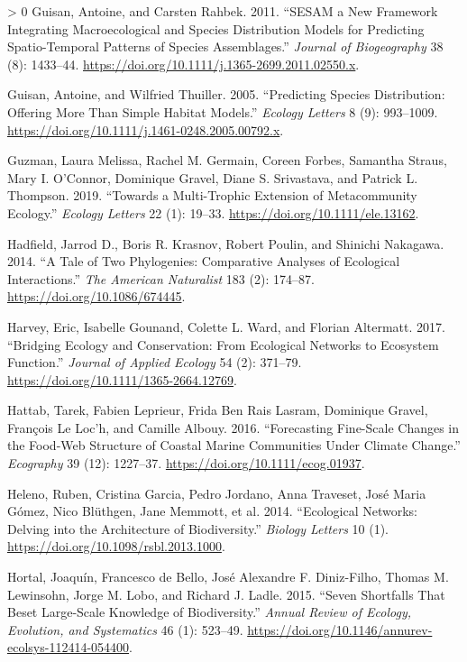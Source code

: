 \documentclass[10pt,oneside]{article}
\newlength{\cslhangindent}
\newenvironment{CSLReferences}[3] %
 {%
  \setlength{\parindent}{0pt}
  \ifodd #1 \everypar{\setlength{\hangindent}{\cslhangindent}}\ignorespaces\fi
  \ifnum #2 > 0
  \setlength{\parskip}{#2\baselineskip}
  \fi
 }%
 {}
\begin{document}
\begin{CSLReferences}{1}{0}
\leavevmode\hypertarget{ref-Guisan2011SesNew}{}%
Guisan, Antoine, and Carsten Rahbek. 2011. {``SESAM a New Framework
Integrating Macroecological and Species Distribution Models for
Predicting Spatio-Temporal Patterns of Species Assemblages.''}
\emph{Journal of Biogeography} 38 (8): 1433--44.
\url{https://doi.org/10.1111/j.1365-2699.2011.02550.x}.

\leavevmode\hypertarget{ref-Guisan2005PreSpe}{}%
Guisan, Antoine, and Wilfried Thuiller. 2005. {``Predicting Species
Distribution: Offering More Than Simple Habitat Models.''} \emph{Ecology
Letters} 8 (9): 993--1009.
\url{https://doi.org/10.1111/j.1461-0248.2005.00792.x}.

\leavevmode\hypertarget{ref-Guzman2019MulExt}{}%
Guzman, Laura Melissa, Rachel M. Germain, Coreen Forbes, Samantha
Straus, Mary I. O'Connor, Dominique Gravel, Diane S. Srivastava, and
Patrick L. Thompson. 2019. {``Towards a Multi-Trophic Extension of
Metacommunity Ecology.''} \emph{Ecology Letters} 22 (1): 19--33.
\url{https://doi.org/10.1111/ele.13162}.

\leavevmode\hypertarget{ref-Hadfield2014TalTwo}{}%
Hadfield, Jarrod D., Boris R. Krasnov, Robert Poulin, and Shinichi
Nakagawa. 2014. {``A Tale of Two Phylogenies: Comparative Analyses of
Ecological Interactions.''} \emph{The American Naturalist} 183 (2):
174--87. \url{https://doi.org/10.1086/674445}.

\leavevmode\hypertarget{ref-Harvey2017BriEco}{}%
Harvey, Eric, Isabelle Gounand, Colette L. Ward, and Florian Altermatt.
2017. {``Bridging Ecology and Conservation: From Ecological Networks to
Ecosystem Function.''} \emph{Journal of Applied Ecology} 54 (2):
371--79. \url{https://doi.org/10.1111/1365-2664.12769}.

\leavevmode\hypertarget{ref-Hattab2016ForFin}{}%
Hattab, Tarek, Fabien Leprieur, Frida Ben Rais Lasram, Dominique Gravel,
François Le Loc'h, and Camille Albouy. 2016. {``Forecasting Fine-Scale
Changes in the Food-Web Structure of Coastal Marine Communities Under
Climate Change.''} \emph{Ecography} 39 (12): 1227--37.
\url{https://doi.org/10.1111/ecog.01937}.

\leavevmode\hypertarget{ref-Heleno2014EcoNet}{}%
Heleno, Ruben, Cristina Garcia, Pedro Jordano, Anna Traveset, José Maria
Gómez, Nico Blüthgen, Jane Memmott, et al. 2014. {``Ecological Networks:
Delving into the Architecture of Biodiversity.''} \emph{Biology Letters}
10 (1). \url{https://doi.org/10.1098/rsbl.2013.1000}.

\leavevmode\hypertarget{ref-Hortal2015SevSho}{}%
Hortal, Joaquín, Francesco de Bello, José Alexandre F. Diniz-Filho,
Thomas M. Lewinsohn, Jorge M. Lobo, and Richard J. Ladle. 2015. {``Seven
Shortfalls That Beset Large-Scale Knowledge of Biodiversity.''}
\emph{Annual Review of Ecology, Evolution, and Systematics} 46 (1):
523--49. \url{https://doi.org/10.1146/annurev-ecolsys-112414-054400}.


\end{CSLReferences}
\end{document}
